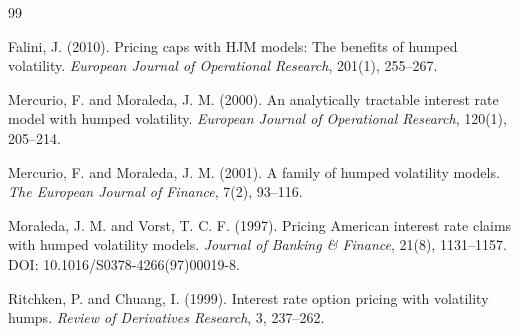 \documentclass[12pt]{article}
\theoremstyle{statementstyle}
\begin{document}
\clearpage
\begin{thebibliography}{99}

Falini, J. (2010).
Pricing caps with HJM models: The benefits of humped volatility.
\emph{European Journal of Operational Research}, 201(1), 255--267.

Mercurio, F. and Moraleda, J. M. (2000).
An analytically tractable interest rate model with humped volatility.
\emph{European Journal of Operational Research}, 120(1), 205--214.

Mercurio, F. and Moraleda, J. M. (2001).
A family of humped volatility models.
\emph{The European Journal of Finance}, 7(2), 93--116.

Moraleda, J. M. and Vorst, T. C. F. (1997).
Pricing American interest rate claims with humped volatility models.
\emph{Journal of Banking \& Finance}, 21(8), 1131--1157.
DOI: 10.1016/S0378-4266(97)00019-8.

Ritchken, P. and Chuang, I. (1999).
Interest rate option pricing with volatility humps.
\emph{Review of Derivatives Research}, 3, 237--262.

\end{thebibliography}
\end{document}

